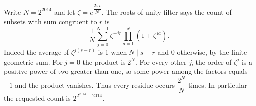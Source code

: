 Write $ N=2^{2014}$ and let $\zeta=e^{\dfrac{2\pi i}{N}}$. The roots-of-unity filter says the count of subsets with sum congruent to $ r $ is
\[\dfrac{1}{N}\sum_{j=0}^{N-1}\zeta^{-jr}\prod_{a=1}^N(1+\zeta^{ja}).\]
Indeed the average of $\zeta^{j(s-r)}$ is 1 when $ N\mid s-r $ and 0 otherwise, by the finite geometric sum. For $ j=0 $ the product is $ 2^N $. For every other $ j $, the order of $\zeta^j $ is a positive power of two greater than one, so some power among the factors equals $-1 $ and the product vanishes. Thus every residue occurs $\dfrac{2^N}{N}$ times. In particular the requested count is $\boxed{2^{2^{2014}-2014}}$.
